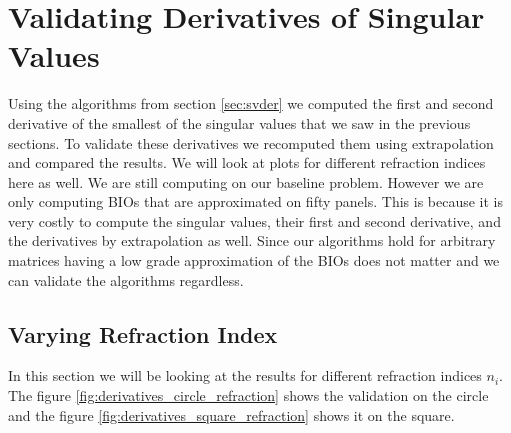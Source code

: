 \documentclass[a4paper, oneside]{discothesis}
\begin{document}
\section{Validating Derivatives of Singular Values}
Using the algorithms from section \ref{sec:svder} we computed the first and second derivative of the smallest of the singular values that we saw in the previous sections.
To validate these derivatives we recomputed them using extrapolation and compared the results.
We will look at plots for different refraction indices here as well.
We are still computing on our baseline problem.
However we are only computing BIOs that are approximated on fifty panels.
This is because it is very costly to compute the singular values, their first and second derivative, and the derivatives by extrapolation as well.
Since our algorithms hold for arbitrary matrices having a low grade approximation of the BIOs does not matter and we can validate the algorithms regardless.
\subsection{Varying Refraction Index}
In this section we will be looking at the results for different refraction indices $n_i$.
The figure \ref{fig:derivatives_circle_refraction} shows the validation on the circle and the figure \ref{fig:derivatives_square_refraction} shows it on the square.
\end{document}
